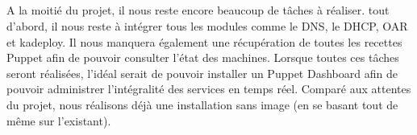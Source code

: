 \documentclass[a4paper, 10pt, onecolumn]{report}
\begin{document}
\newpage
\subsection{}

A la moitié du projet, il nous reste encore beaucoup de tâches à réaliser. tout d’abord, il nous
reste à intégrer tous les modules comme le DNS, le DHCP, OAR et kadeploy. Il nous manquera
également une récupération de toutes les recettes Puppet afin de pouvoir consulter l’état des
machines. Lorsque toutes ces tâches seront réalisées, l’idéal serait de pouvoir installer un
Puppet Dashboard afin de pouvoir administrer l’intégralité des services en temps réel. Comparé
aux attentes du projet, nous réalisons déjà une installation sans image (en se basant tout de
même sur l’existant).
\end{document}
